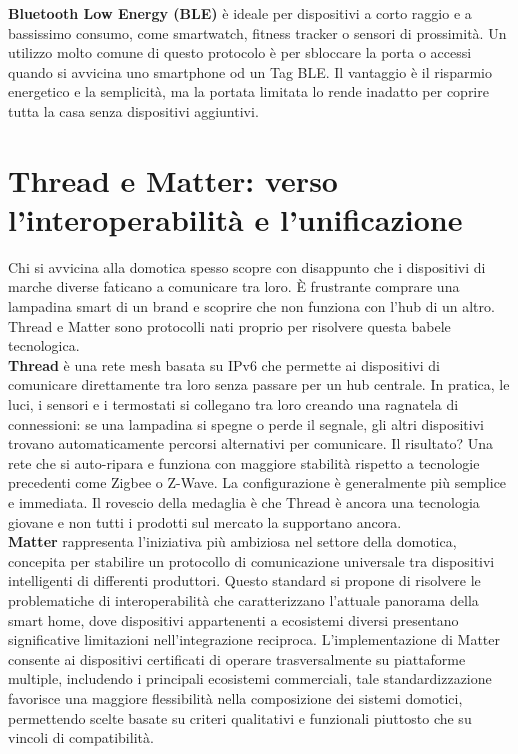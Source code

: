 \textbf{Bluetooth Low Energy (BLE)} è ideale per dispositivi a corto raggio e a bassissimo consumo, come smartwatch, fitness tracker o sensori di prossimità. Un utilizzo molto comune di questo protocolo è per sbloccare la porta  o accessi quando si avvicina uno smartphone od un Tag BLE. Il vantaggio è il risparmio energetico e la semplicità, ma la portata limitata lo rende inadatto per coprire tutta la casa senza dispositivi aggiuntivi.
\section{Thread e Matter: verso l'interoperabilità e l'unificazione}
Chi si avvicina alla domotica spesso scopre con disappunto che i dispositivi di marche diverse faticano a comunicare tra loro. È frustrante comprare una lampadina smart di un brand e scoprire che non funziona con l'hub di un altro. Thread e Matter sono protocolli nati proprio per risolvere questa babele tecnologica.\\

\textbf{Thread} è una rete mesh basata su IPv6 che permette ai dispositivi di comunicare direttamente tra loro senza passare per un hub centrale. In pratica, le luci, i sensori e i termostati si collegano tra loro creando una ragnatela di connessioni: se una lampadina si spegne o perde il segnale, gli altri dispositivi trovano automaticamente percorsi alternativi per comunicare. Il risultato? Una rete che si auto-ripara e funziona con maggiore stabilità rispetto a tecnologie precedenti come Zigbee o Z-Wave. La configurazione è generalmente più semplice e immediata. Il rovescio della medaglia è che Thread è ancora una tecnologia giovane e non tutti i prodotti sul mercato la supportano ancora.\\

\textbf{Matter} rappresenta l'iniziativa più ambiziosa nel settore della domotica, concepita per stabilire un protocollo di comunicazione universale tra dispositivi intelligenti di differenti produttori. Questo standard si propone di risolvere le problematiche di interoperabilità che caratterizzano l'attuale panorama della smart home, dove dispositivi appartenenti a ecosistemi diversi presentano significative limitazioni nell'integrazione reciproca. L'implementazione di Matter consente ai dispositivi certificati di operare trasversalmente su piattaforme multiple, includendo i principali ecosistemi commerciali, tale standardizzazione favorisce una maggiore flessibilità nella composizione dei sistemi domotici, permettendo scelte basate su criteri qualitativi e funzionali piuttosto che su vincoli di compatibilità.

